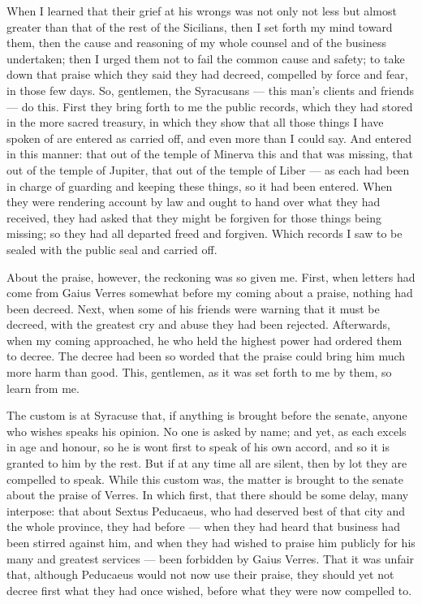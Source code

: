  When I learned that their grief at his wrongs was not only not less but almost greater than that of the rest of the Sicilians, then I set forth my mind toward them, then the cause and reasoning of my whole counsel and of the business undertaken; then I urged them not to fail the common cause and safety; to take down that praise which they said they had decreed, compelled by force and fear, in those few days. So, gentlemen, the Syracusans --- this man's clients and friends --- do this. First they bring forth to me the public records, which they had stored in the more sacred treasury, in which they show that all those things I have spoken of are entered as carried off, and even more than I could say. And entered in this manner: that out of the temple of Minerva this and that was missing, that out of the temple of Jupiter, that out of the temple of Liber --- as each had been in charge of guarding and keeping these things, so it had been entered. When they were rendering account by law and ought to hand over what they had received, they had asked that they might be forgiven for those things being missing; so they had all departed freed and forgiven. Which records I saw to be sealed with the public seal and carried off.

 About the praise, however, the reckoning was so given me. First, when letters had come from Gaius Verres somewhat before my coming about a praise, nothing had been decreed. Next, when some of his friends were warning that it must be decreed, with the greatest cry and abuse they had been rejected. Afterwards, when my coming approached, he who held the highest power had ordered them to decree. The decree had been so worded that the praise could bring him much more harm than good. This, gentlemen, as it was set forth to me by them, so learn from me.

 The custom is at Syracuse that, if anything is brought before the senate, anyone who wishes speaks his opinion. No one is asked by name; and yet, as each excels in age and honour, so he is wont first to speak of his own accord, and so it is granted to him by the rest. But if at any time all are silent, then by lot they are compelled to speak. While this custom was, the matter is brought to the senate about the praise of Verres. In which first, that there should be some delay, many interpose: that about Sextus Peducaeus, who had deserved best of that city and the whole province, they had before --- when they had heard that business had been stirred against him, and when they had wished to praise him publicly for his many and greatest services --- been forbidden by Gaius Verres. That it was unfair that, although Peducaeus would not now use their praise, they should yet not decree first what they had once wished, before what they were now compelled to.

